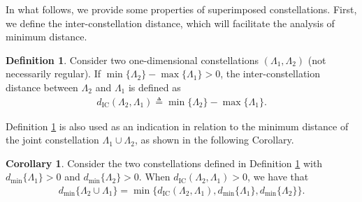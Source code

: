\documentclass[12pt, draftclsnofoot, onecolumn]{IEEEtran}
\theoremstyle{definition}
\newtheorem{define}{Definition}
\newtheorem{corollary}{Corollary}
\begin{document}
In what follows, we provide some properties of superimposed constellations. First, we define the inter-constellation distance, which will facilitate the analysis of minimum distance.
\begin{define}\label{def:dic}
Consider two one-dimensional constellations $(\Lambda_1,\Lambda_2)$ (not necessarily regular). If $\min\{\Lambda_2\} - \max\{\Lambda_1\}>0$, the inter-constellation distance between $\Lambda_2$ and $\Lambda_1$ is defined as
\begin{align}
d_{\text{IC}}(\Lambda_2,\Lambda_1) \triangleq \min\{\Lambda_2\} - \max\{\Lambda_1\}.
\end{align}
\end{define}
Definition \ref{def:dic} is also used as an indication in relation to the minimum distance of the joint constellation $\Lambda_1\cup\Lambda_2$, as shown in the following Corollary.
\begin{corollary}\label{corollary1}
Consider the two constellations defined in Definition \ref{def:dic} with $d_{\min}\{\Lambda_1\}>0$ and $d_{\min}\{\Lambda_2\}>0$. When $d_{\text{IC}}(\Lambda_2,\Lambda_1)>0$, we have that
\begin{align}
d_{\min}\{\Lambda_2  \cup \Lambda_1\} = \min\{d_{\text{IC}}(\Lambda_2,\Lambda_1), d_{\min}\{\Lambda_1\},d_{\min}\{\Lambda_2\}\}.
\end{align}
\end{corollary}
\end{document}
